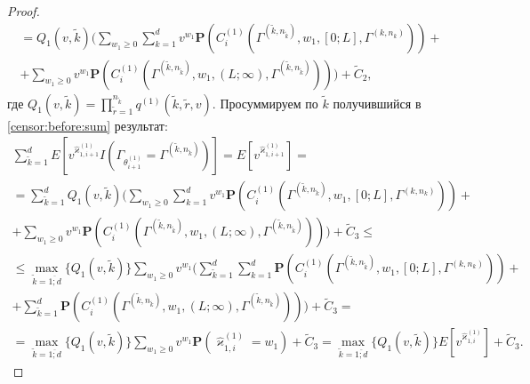 \documentclass[a4paper,twoside]{article}
\theoremstyle{theorem}
\theoremstyle{remark}
\renewcommand{\Pr}{{\mathbf P}}
\begin{document}
\begin{proof}
\begin{multline}
  = Q_1(v,\tilde{k})  \biggl(\sum_{w_1\geqslant 0} \sum_{k=1}^d v^{w_1} \Pr(C_i^{(1)}(\Gamma^{(\tilde{k},n_{\tilde{k}})},w_1,[0;L],\Gamma^{(k,n_k)} )) + \\
   + \sum_{w_1\geqslant 0}  v^{w_1} \Pr(C_i^{(1)}(\Gamma^{(\tilde{k},n_{\tilde{k}})},w_1,(L;\infty),\Gamma^{(\tilde{k},n_{\tilde{k}})} ))\biggr) + \widetilde{C}_2,
   \label{censor:before:sum}
  \end{multline}
где $Q_1(v,\tilde{k})= \prod_{\tilde{r}=1}^{n_{\tilde{k}}} q^{(1)}(\tilde{k},\tilde{r},v) $. Просуммируем по $\tilde{k}$ получившийся в \eqref{censor:before:sum} результат:
\allowdisplaybreaks
\begin{multline*}
\sum_{\tilde{k}=1}^d E[v^{\hat{\varkappa}_{1,i+1}^{(1)}} I(\Gamma_{\theta_{i+1}^{(1)}}= \Gamma^{(\tilde{k},n_{\tilde{k}})})]=   E[v^{\hat{\varkappa}_{1,i+1}^{(1)}} ]=\\
  = \sum_{\tilde{k}=1}^d Q_1(v,\tilde{k})  \biggl(\sum_{w_1\geqslant 0} \sum_{k=1}^d v^{w_1} \Pr(C_i^{(1)}(\Gamma^{(\tilde{k},n_{\tilde{k}})},w_1,[0;L],\Gamma^{(k,n_k)} )) + \\
   + \sum_{w_1\geqslant 0}  v^{w_1} \Pr(C_i^{(1)}(\Gamma^{(\tilde{k},n_{\tilde{k}})},w_1,(L;\infty),\Gamma^{(\tilde{k},n_{\tilde{k}})} ))\biggr) + \widetilde{C}_3 \leqslant \\ \leqslant
   \max_{ \tilde{k}=\overline{1;d} }{\{Q_1(v,\tilde{k}) \}} \sum_{w_1\geqslant 0}  v^{w_1} \biggl(\sum_{\tilde{k}=1}^d \sum_{k=1}^d  \Pr(C_i^{(1)}(\Gamma^{(\tilde{k},n_{\tilde{k}})},w_1,[0;L],\Gamma^{(k,n_k)} )) + \\
   +  \sum_{\tilde{k}=1}^d \Pr(C_i^{(1)}(\Gamma^{(\tilde{k},n_{\tilde{k}})},w_1,(L;\infty),\Gamma^{(\tilde{k},n_{\tilde{k}})} ))\biggr) + \widetilde{C}_3 = \\
   =\max_{ \tilde{k}=\overline{1;d} }{\{Q_1(v,\tilde{k}) \}} \sum_{w_1\geqslant 0}  v^{w_1} \Pr(\hat{\varkappa}_{1,i}^{(1)}=w_1)+ \widetilde{C}_3=\max_{ \tilde{k}=\overline{1;d} }{\{Q_1(v,\tilde{k}) \}} E[v^{\hat{\varkappa}_{1,i}^{(1)}} ]+ \widetilde{C}_3.
  \end{multline*}


\end{proof}
\end{document}
